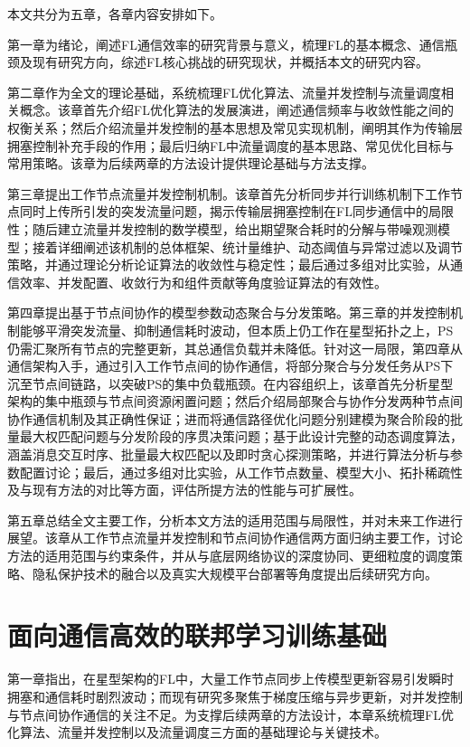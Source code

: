 \documentclass[master, vlined]{DissertUESTC}
\begin{document}
	本文共分为五章，各章内容安排如下。

	第一章为绪论，阐述FL通信效率的研究背景与意义，梳理FL的基本概念、通信瓶颈及现有研究方向，综述FL核心挑战的研究现状，并概括本文的研究内容。

	第二章作为全文的理论基础，系统梳理FL优化算法、流量并发控制与流量调度相关概念。该章首先介绍FL优化算法的发展演进，阐述通信频率与收敛性能之间的权衡关系；然后介绍流量并发控制的基本思想及常见实现机制，阐明其作为传输层拥塞控制补充手段的作用；最后归纳FL中流量调度的基本思路、常见优化目标与常用策略。该章为后续两章的方法设计提供理论基础与方法支撑。

	第三章提出工作节点流量并发控制机制。该章首先分析同步并行训练机制下工作节点同时上传所引发的突发流量问题，揭示传输层拥塞控制在FL同步通信中的局限性；随后建立流量并发控制的数学模型，给出期望聚合耗时的分解与带噪观测模型；接着详细阐述该机制的总体框架、统计量维护、动态阈值与异常过滤以及调节策略，并通过理论分析论证算法的收敛性与稳定性；最后通过多组对比实验，从通信效率、并发配置、收敛行为和组件贡献等角度验证算法的有效性。

	第四章提出基于节点间协作的模型参数动态聚合与分发策略。第三章的并发控制机制能够平滑突发流量、抑制通信耗时波动，但本质上仍工作在星型拓扑之上，PS仍需汇聚所有节点的完整更新，其总通信负载并未降低。针对这一局限，第四章从通信架构入手，通过引入工作节点间的协作通信，将部分聚合与分发任务从PS下沉至节点间链路，以突破PS的集中负载瓶颈。在内容组织上，该章首先分析星型架构的集中瓶颈与节点间资源闲置问题；然后介绍局部聚合与协作分发两种节点间协作通信机制及其正确性保证；进而将通信路径优化问题分别建模为聚合阶段的批量最大权匹配问题与分发阶段的序贯决策问题；基于此设计完整的动态调度算法，涵盖消息交互时序、批量最大权匹配以及即时贪心探测策略，并进行算法分析与参数配置讨论；最后，通过多组对比实验，从工作节点数量、模型大小、拓扑稀疏性及与现有方法的对比等方面，评估所提方法的性能与可扩展性。

	第五章总结全文主要工作，分析本文方法的适用范围与局限性，并对未来工作进行展望。该章从工作节点流量并发控制和节点间协作通信两方面归纳主要工作，讨论方法的适用范围与约束条件，并从与底层网络协议的深度协同、更细粒度的调度策略、隐私保护技术的融合以及真实大规模平台部署等角度提出后续研究方向。

	\chapter{面向通信高效的联邦学习训练基础}

	第一章指出，在星型架构的FL中，大量工作节点同步上传模型更新容易引发瞬时拥塞和通信耗时剧烈波动；而现有研究多聚焦于梯度压缩与异步更新，对并发控制与节点间协作通信的关注不足。为支撑后续两章的方法设计，本章系统梳理FL优化算法、流量并发控制以及流量调度三方面的基础理论与关键技术。
\end{document}

